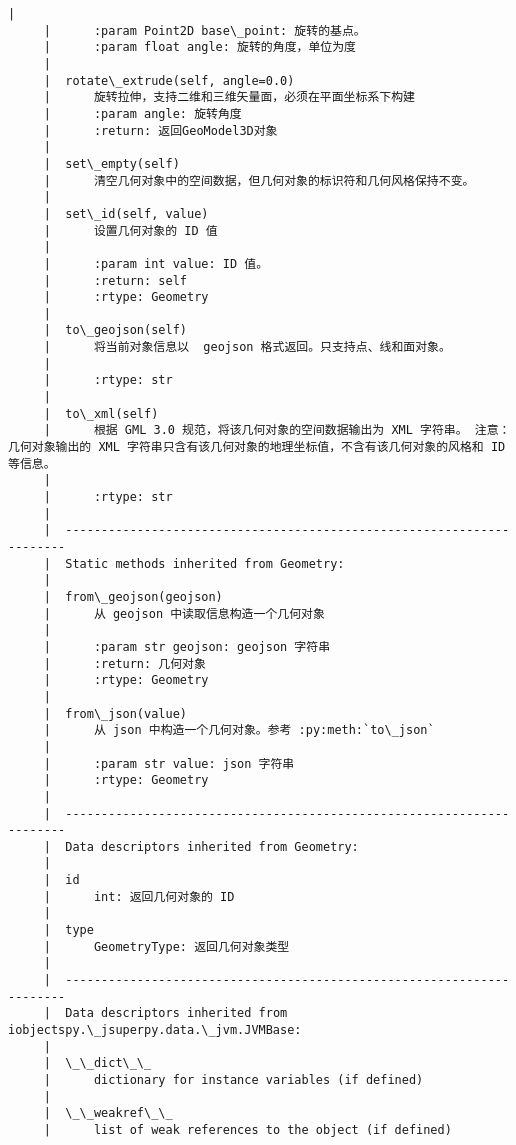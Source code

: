\documentclass[11pt]{article}
\begin{document}
\begin{Verbatim}[commandchars=\\\{\}]
     |      
     |      :param Point2D base\_point: 旋转的基点。
     |      :param float angle: 旋转的角度，单位为度
     |  
     |  rotate\_extrude(self, angle=0.0)
     |      旋转拉伸，支持二维和三维矢量面，必须在平面坐标系下构建
     |      :param angle: 旋转角度
     |      :return: 返回GeoModel3D对象
     |  
     |  set\_empty(self)
     |      清空几何对象中的空间数据，但几何对象的标识符和几何风格保持不变。
     |  
     |  set\_id(self, value)
     |      设置几何对象的 ID 值
     |      
     |      :param int value: ID 值。
     |      :return: self
     |      :rtype: Geometry
     |  
     |  to\_geojson(self)
     |      将当前对象信息以  geojson 格式返回。只支持点、线和面对象。
     |      
     |      :rtype: str
     |  
     |  to\_xml(self)
     |      根据 GML 3.0 规范，将该几何对象的空间数据输出为 XML 字符串。 注意：几何对象输出的 XML 字符串只含有该几何对象的地理坐标值，不含有该几何对象的风格和 ID 等信息。
     |      
     |      :rtype: str
     |  
     |  ----------------------------------------------------------------------
     |  Static methods inherited from Geometry:
     |  
     |  from\_geojson(geojson)
     |      从 geojson 中读取信息构造一个几何对象
     |      
     |      :param str geojson: geojson 字符串
     |      :return: 几何对象
     |      :rtype: Geometry
     |  
     |  from\_json(value)
     |      从 json 中构造一个几何对象。参考 :py:meth:`to\_json`
     |      
     |      :param str value: json 字符串
     |      :rtype: Geometry
     |  
     |  ----------------------------------------------------------------------
     |  Data descriptors inherited from Geometry:
     |  
     |  id
     |      int: 返回几何对象的 ID
     |  
     |  type
     |      GeometryType: 返回几何对象类型
     |  
     |  ----------------------------------------------------------------------
     |  Data descriptors inherited from iobjectspy.\_jsuperpy.data.\_jvm.JVMBase:
     |  
     |  \_\_dict\_\_
     |      dictionary for instance variables (if defined)
     |  
     |  \_\_weakref\_\_
     |      list of weak references to the object (if defined)
    

\end{Verbatim}
\end{document}
